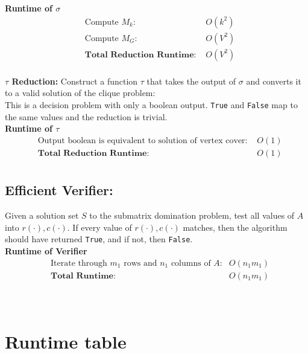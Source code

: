 \documentclass[11pt]{article}
\begin{document}
\textbf{Runtime of $\sigma$}
\begin{align*}
&\text{Compute $M_k$: } &O(k^2)\\ 
&\text{Compute $M_G$: } &O(V^2)\\ 
&\textbf{Total Reduction Runtime: } &O(V^2)\\
\end{align*}


\textbf{$\tau$ Reduction:}
Construct a function $\tau$ that takes the output of $\sigma$ and converts it to a valid solution of the clique problem:\\

This is a decision problem with only a boolean output. \texttt{True} and \texttt{False} map to the same values and the reduction is trivial.\\

\textbf{Runtime of $\tau$ }
\begin{align*}
&\text{Output boolean is equivalent to solution of vertex cover: } &O(1)\\ 
&\textbf{Total Reduction Runtime: } &O(1)\\
\end{align*}


\subsection{Efficient Verifier:}
Given a solution set $S$ to the submatrix domination problem, test all values of $A$ into $r(\cdot),c(\cdot)$. If every value of $r(\cdot),c(\cdot)$ matches, then the algorithm should have returned \texttt{True}, and if not, then \texttt{False}. \\

\textbf{Runtime of Verifier }
\begin{align*}
&\text{Iterate through $m_1$ rows and $n_1$ columns of $A$:} &O(n_1m_1)\\
&\textbf{Total Runtime: } &O(n_1m_1)\\
\end{align*}

\begin{center}
\quad{}\quad{}\\
\end{center}

\section{Runtime table}
\end{document}
